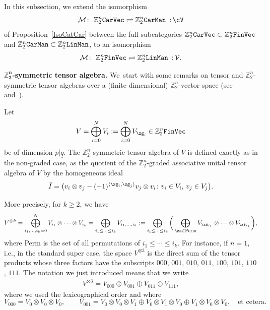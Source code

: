 \documentclass[10pt,a4paper]{amsart}
\newcommand{\op}[1]{\operatorname{#1}}
\newcommand{\Z}{{\mathbb Z}}
\def\ul{\underline}
\def\cM{\cal M}
\def\cM{\mathcal{M}}
\def\ul{\underline}
\newcommand{\0}{\otimes}
\numberwithin{equation}{section}
\providecommand{\cal}{\mathcal}
\begin{document}
In this subsection, we extend the isomorphism
\[
\cM\colon\ \Z_2^n{\tt CarVec}\rightleftharpoons\Z_2^n{\tt CarMan}\ \,{:}\, \cV
\]
of Proposition~\ref{IsoCatCar} between the full subcategories $\Z_2^n{\tt CarVec}\subset\Z_2^n{\tt FinVec}$ and $\Z_2^n{\tt CarMan}\subset\Z_2^n{\tt LinMan}$, to an isomorphism
\[
\mathcal{M}\colon\ \Z_2^n{\tt FinVec}\rightleftharpoons\Z_2^n{\tt LinMan}\ \,{:}\, \mathcal{V}.
\]

\noindent\textbf{$\boldsymbol{\Z_2^n}$-symmetric tensor algebra.} We~start with some remarks on tensor and $\Z_2^n$-symmetric tensor algebras over a (finite dimensional) $\Z_2^n$-vector space (see~\cite{Manin1988} and~\cite{BP13}).

Let
\[
V=\bigoplus_{i=0}^NV_{i}:=\bigoplus_{i=0}^NV_{\zg_i}\in\Z_2^n{\tt FinVec}
\]
be of dimension $p|\ul{q}$. The $\Z_2^n$-symmetric tensor algebra of $V$ is defined exactly as in the non-graded case, as the quotient of the $\Z_2^n$-graded associative unital tensor algebra of $V$ by the homogeneous ideal
\[
\bar{I}=\big(v_i \otimes v_j - (-1)^{\langle \zg_i, \zg_j \rangle } v_j \otimes v_i\colon v_i \in V_i,\, v_j \in V_j \big).
\]

More precisely, for $k\ge 2$, we have
\begin{gather*}%
V^{\0 k}=\bigoplus_{i_1,\dots, i_k=0}^NV_{i_1}\0\cdots\0V_{i_k}=\bigoplus_{i_1\le\cdots\le i_k}V_{i_1,\dots,i_k}:=\bigoplus_{i_1\le\cdots\le i_k}\bigg(\bigoplus_{\zs\in\op{Perm}}V_{\zs_{i_1}}\0\cdots\0V_{\zs_{i_k}}\bigg),
\end{gather*}
where Perm is the set of all permutations of $i_1\le\cdots\le i_k$. For instance, if $n=1$, i.e., in the standard super case, the space $V^{\0 3}$ is the direct sum of the tensor products whose three factors have the subscripts $000$, $001$, $010$, $011$, $100$, $101$, $110$, $111$. The notation we just introduced means that we write
\begin{gather*}%
V^{\0 3}=V_{000}\oplus V_{001}\oplus V_{011}\oplus V_{111},
\end{gather*}
where we used the lexicographical order and where
\[
V_{000}=V_0\0V_0\0V_0,\qquad
V_{001}=V_0\0V_0\0V_1\oplus V_0\0V_1\0V_0\oplus V_1\0V_0\0V_0,\quad
\text{et cetera}.
\]
\end{document}
